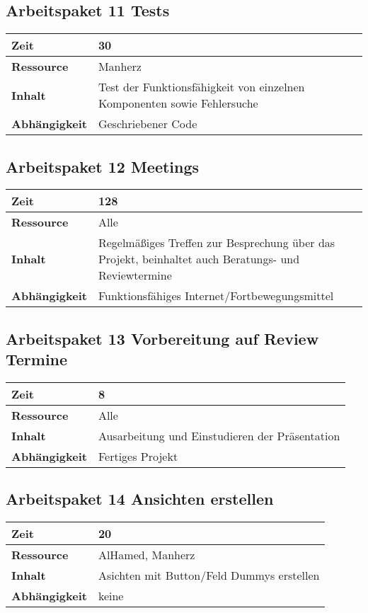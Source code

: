 \documentclass[12pt,a4paper,onecolumn]{article}
\begin{document}
\subsection{Arbeitspaket 11 Tests}
\begin{tabularx}{\textwidth}{|l|X|}
\hline
     \textbf{Zeit} & 30\\
     \hline
     \textbf{Ressource} & Manherz\\
     \hline
     \textbf{Inhalt} & Test der Funktionsfähigkeit von einzelnen Komponenten sowie Fehlersuche\\
     \hline
     \textbf{Abhängigkeit} & Geschriebener Code\\
\hline
\end{tabularx}

\subsection{Arbeitspaket 12 Meetings}
\begin{tabularx}{\textwidth}{|l|X|}
\hline
     \textbf{Zeit} & 128\\
     \hline
     \textbf{Ressource} & Alle\\
     \hline
     \textbf{Inhalt} & Regelmäßiges Treffen zur Besprechung über das Projekt, beinhaltet auch Beratungs- und Reviewtermine\\
     \hline
     \textbf{Abhängigkeit} & Funktionsfähiges Internet/Fortbewegungsmittel\\
\hline
\end{tabularx}

\subsection{Arbeitspaket 13 Vorbereitung auf Review Termine}
\begin{tabularx}{\textwidth}{|l|X|}
\hline
     \textbf{Zeit} &  8\\
     \hline
     \textbf{Ressource} & Alle\\
     \hline
     \textbf{Inhalt} &  Ausarbeitung und Einstudieren der Präsentation\\
     \hline
     \textbf{Abhängigkeit} & Fertiges Projekt\\
\hline
\end{tabularx}

\subsection{Arbeitspaket 14 Ansichten erstellen}
\begin{tabularx}{\textwidth}{|l|X|}
\hline
     \textbf{Zeit} & 20 \\
     \hline
     \textbf{Ressource} & AlHamed, Manherz\\
     \hline
     \textbf{Inhalt} & Asichten mit Button/Feld Dummys erstellen\\
     \hline
     \textbf{Abhängigkeit} & keine\\
\hline
\end{tabularx}
\end{document}
